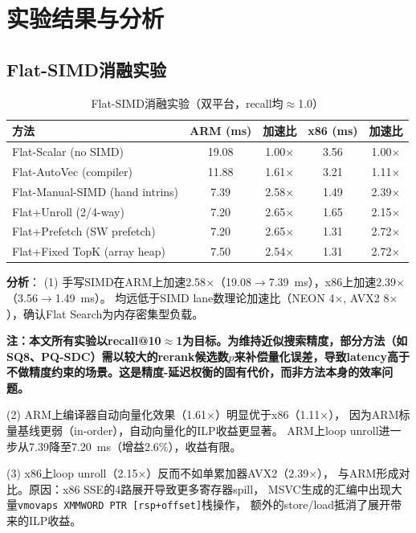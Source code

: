 \documentclass[11pt,a4paper]{article}
\begin{document}
\section{实验结果与分析}

\subsection{Flat-SIMD消融实验}

\begin{table}[H]
\centering
\caption{Flat-SIMD消融实验（双平台，recall均$\approx$1.0）}
\label{tab:flat}
\small
\begin{tabular}{lcccc}
\toprule
\textbf{方法} & \textbf{ARM (ms)} & \textbf{加速比} & \textbf{x86 (ms)} & \textbf{加速比} \\
\midrule
Flat-Scalar (no SIMD)           & 19.08 & 1.00$\times$ & 3.56 & 1.00$\times$ \\
Flat-AutoVec (compiler)         & 11.88 & 1.61$\times$ & 3.21 & 1.11$\times$ \\
Flat-Manual-SIMD (hand intrins) & 7.39  & 2.58$\times$ & 1.49 & 2.39$\times$ \\
Flat+Unroll (2/4-way)           & 7.20  & 2.65$\times$ & 1.65 & 2.15$\times$ \\
Flat+Prefetch (SW prefetch)     & 7.20  & 2.65$\times$ & 1.31 & 2.72$\times$ \\
Flat+Fixed TopK (array heap)    & 7.50  & 2.54$\times$ & 1.31 & 2.72$\times$ \\
\bottomrule
\end{tabular}
\end{table}

\textbf{分析}：
(1) 手写SIMD在ARM上加速2.58$\times$（19.08$\to$7.39~ms），x86上加速2.39$\times$（3.56$\to$1.49~ms）。
均远低于SIMD lane数理论加速比（NEON 4$\times$, AVX2 8$\times$），确认Flat Search为内存密集型负载。

\textbf{注：本文所有实验以recall@10$\approx$1为目标。为维持近似搜索精度，部分方法（如SQ8、PQ-SDC）需以较大的rerank候选数$p$来补偿量化误差，导致latency高于不做精度约束的场景。这是精度-延迟权衡的固有代价，而非方法本身的效率问题。}

(2) ARM上编译器自动向量化效果（1.61$\times$）明显优于x86（1.11$\times$），
因为ARM标量基线更弱（in-order），自动向量化的ILP收益更显著。
ARM上loop unroll进一步从7.39降至7.20~ms（增益2.6\%），收益有限。

(3) x86上loop unroll（2.15$\times$）反而不如单累加器AVX2（2.39$\times$），
与ARM形成对比。原因：x86 SSE的4路展开导致更多寄存器spill，
MSVC生成的汇编中出现大量\texttt{vmovaps XMMWORD PTR [rsp+offset]}栈操作，
额外的store/load抵消了展开带来的ILP收益。
\end{document}
